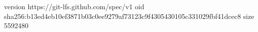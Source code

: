version https://git-lfs.github.com/spec/v1
oid sha256:b13ed4eb10ef3871b03c0ee9279af73123c9f4305430105c331029fbf41dcec8
size 5592480
